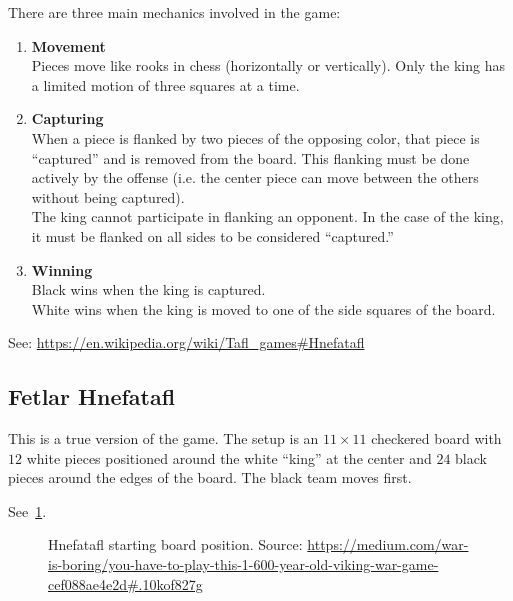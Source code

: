 \documentclass[11pt, oneside]{article}
\begin{document}
There are three main mechanics involved in the game:
\begin{enumerate}
\item \textbf{Movement}\\
  Pieces move like rooks in chess (horizontally or vertically).
  Only the king has a limited motion of three squares at a time.
\item \textbf{Capturing}\\
  When a piece is flanked by two pieces of the opposing color, that piece is
  ``captured'' and is removed from the board.  This flanking must be done
  actively by the offense (i.e. the center piece can move between the others
  without being captured).\\
  The king cannot participate in flanking an opponent. In the case of the king,
  it must be flanked on all sides to be considered ``captured.''
\item \textbf{Winning}\\
  Black wins when the king is captured.\\
  White wins when the king is moved to one of the side squares of the board.
\end{enumerate}
See: \url{https://en.wikipedia.org/wiki/Tafl\_games\#Hnefatafl}

\subsection{Fetlar Hnefatafl}
This is a true version of the game.  The setup is an $11\times11$ checkered board with $12$ white
pieces positioned around the white ``king'' at the center and $24$ black pieces around the edges of the board. The black team moves first.

See~\ref{fig:initial_position}.
\begin{figure}\label{fig:initial_position}
  \centering
  \caption{Hnefatafl starting board position. Source: \url{https://medium.com/war-is-boring/you-have-to-play-this-1-600-year-old-viking-war-game-cef088ae4e2d\#.10kof827g}}
\end{figure}
\end{document}
